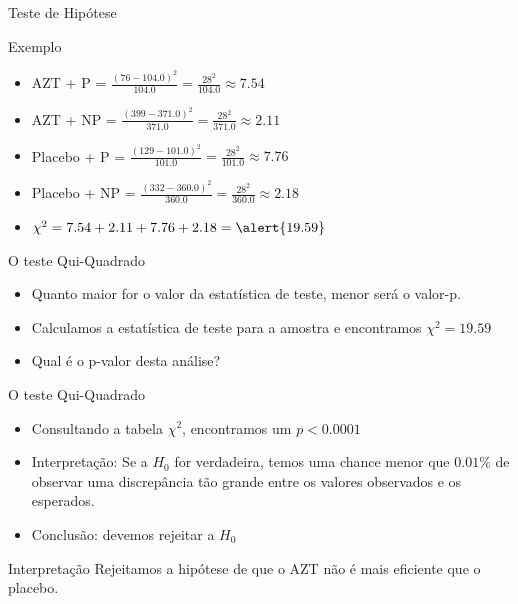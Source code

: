 \documentclass{beamer}
\begin{document}
\begin{frame}{Teste de Hipótese}
  \begin{exampleblock}{Exemplo}
    \begin{itemize}
    \item AZT + P = $\frac{(76 - 104.0)^2}{104.0} = \frac{28^2}{104.0}
      \approx 7.54$
    \item AZT + NP = $\frac{(399 - 371.0)^2}{371.0} =
      \frac{28^2}{371.0} \approx 2.11$
    \item Placebo + P = $\frac{(129 - 101.0)^2}{101.0} =
      \frac{28^2}{101.0} \approx 7.76$
    \item Placebo + NP = $\frac{(332 - 360.0)^2}{360.0} =
      \frac{28^2}{360.0} \approx 2.18$
    \item $\chi^2 = 7.54 + 2.11 + 7.76 + 2.18 = \alert{19.59}$
    \end{itemize}
  \end{exampleblock}
\end{frame}

\begin{frame}{O teste Qui-Quadrado}
  \begin{itemize}
  \item Quanto \alert{maior} for o valor da estatística de teste,
    \alert{menor} será o valor-p.
  \item Calculamos a estatística de teste para a amostra e encontramos
    $\chi^2 = 19.59$
  \item Qual é o p-valor desta análise?
  \end{itemize}
\end{frame}

\begin{frame}{O teste Qui-Quadrado}
  \begin{itemize}
  \item Consultando a tabela $\chi^2$, encontramos um $p<0.0001$
  \item Interpretação: Se a $H_0$ for verdadeira, temos uma
    chance menor que $0.01\%$ de observar uma discrepância tão grande
    entre os valores observados e os esperados.
  \item Conclusão: devemos \alert{rejeitar} a $H_0$
  \end{itemize}
  \begin{block}{Interpretação}
    Rejeitamos a hipótese de que o AZT não é mais eficiente que o
    placebo.
  \end{block}
\end{frame}
\end{document}
